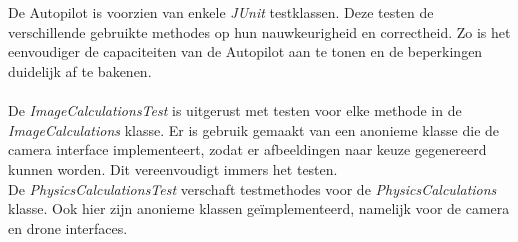 \\
\\
De Autopilot is voorzien van enkele \textit{JUnit} testklassen. Deze testen de verschillende gebruikte methodes op hun nauwkeurigheid en correctheid. Zo is het eenvoudiger de capaciteiten van de Autopilot aan te tonen en de beperkingen duidelijk af te bakenen.
\\
\\
De \textit{ImageCalculationsTest} is uitgerust met testen voor elke methode in de \textit{ImageCalculations} klasse. Er is gebruik gemaakt van een anonieme klasse die de camera interface implementeert, zodat er afbeeldingen naar keuze gegenereerd kunnen worden. Dit vereenvoudigt immers het testen.
\\
De \textit{PhysicsCalculationsTest} verschaft testmethodes voor de \textit{PhysicsCalculations} klasse. Ook hier zijn anonieme klassen ge\"implementeerd, namelijk voor de camera en drone interfaces.

